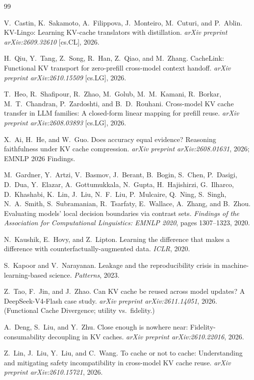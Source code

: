 \documentclass[11pt,a4paper]{article}
\begin{document}

\begin{thebibliography}{99}

 V.~Castin, K.~Sakamoto, A.~Filippova, J.~Monteiro, M.~Cuturi,
and P.~Ablin. KV-Lingo: Learning KV-cache translators with distillation.
\emph{arXiv preprint arXiv:2609.32610} [cs.CL], 2026.

 H.~Qiu, Y.~Tang, Z.~Song, R.~Han, Z.~Qiao, and M.~Zhang.
CacheLink: Functional KV transport for zero-prefill cross-model context handoff.
\emph{arXiv preprint arXiv:2610.15509} [cs.LG], 2026.

 T.~Heo, R.~Shafipour, R.~Zhao, M.~Golub, M.~M.~Kamani,
R.~Borkar, M.~T.~Chandran, P.~Zardoshti, and B.~D.~Rouhani. Cross-model KV cache
transfer in LLM families: A closed-form linear mapping for prefill reuse.
\emph{arXiv preprint arXiv:2608.03893} [cs.LG], 2026.

 X.~Ai, H.~He, and W.~Guo. Does accuracy equal evidence?
Reasoning faithfulness under KV cache compression. \emph{arXiv preprint
arXiv:2608.01631}, 2026; EMNLP 2026 Findings.

 M.~Gardner, Y.~Artzi, V.~Basmov, J.~Berant, B.~Bogin,
S.~Chen, P.~Dasigi, D.~Dua, Y.~Elazar, A.~Gottumukkala, N.~Gupta,
H.~Hajishirzi, G.~Ilharco, D.~Khashabi, K.~Lin, J.~Liu, N.~F.~Liu,
P.~Mulcaire, Q.~Ning, S.~Singh, N.~A.~Smith, S.~Subramanian, R.~Tsarfaty,
E.~Wallace, A.~Zhang, and B.~Zhou. Evaluating models' local decision boundaries
via contrast sets. \emph{Findings of the Association for Computational
Linguistics: EMNLP 2020}, pages 1307--1323, 2020.

 N.~Kaushik, E.~Hovy, and Z.~Lipton. Learning the
difference that makes a difference with counterfactually-augmented data.
\emph{ICLR}, 2020.

 S.~Kapoor and V.~Narayanan. Leakage and the reproducibility
crisis in machine-learning-based science. \emph{Patterns}, 2023.

 Z.~Tao, F.~Jin, and J.~Zhao. Can KV cache be reused across model
updates? A DeepSeek-V4-Flash case study. \emph{arXiv preprint
arXiv:2611.14051}, 2026. (Functional Cache Divergence; utility vs.\ fidelity.)

 A.~Deng, S.~Liu, and Y.~Zhu. Close enough is nowhere near:
Fidelity-consumability decoupling in KV caches. \emph{arXiv preprint
arXiv:2610.22016}, 2026.

 Z.~Lin, J.~Liu, Y.~Liu, and C.~Wang. To cache or not to cache:
Understanding and mitigating safety incompatibility in cross-model KV cache
reuse. \emph{arXiv preprint arXiv:2610.15721}, 2026.


\end{thebibliography}
\end{document}
